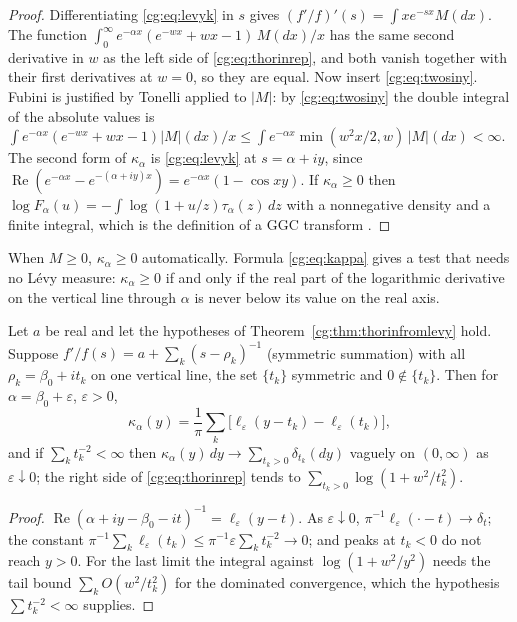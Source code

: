 \begin{proof}
Differentiating \eqref{cg:eq:levyk} in $s$ gives $(f'/f)'(s)=\int xe^{-sx}M(dx)$. The function $\int_0^\infty e^{-\alpha x}(e^{-wx}+wx-1)\,M(dx)/x$ has the same second derivative in $w$ as the left side of \eqref{cg:eq:thorinrep}, and both vanish together with their first derivatives at $w=0$, so they are equal. Now insert \eqref{cg:eq:twosiny}. Fubini is justified by Tonelli applied to $|M|$: by \eqref{cg:eq:twosiny} the double integral of the absolute values is $\int e^{-\alpha x}(e^{-wx}+wx-1)|M|(dx)/x\le\int e^{-\alpha x}\min(w^2x/2,w)\,|M|(dx)<\infty$. The second form of $\kappa_\alpha$ is \eqref{cg:eq:levyk} at $s=\alpha+iy$, since $\operatorname{Re}(e^{-\alpha x}-e^{-(\alpha+iy)x})=e^{-\alpha x}(1-\cos xy)$. If $\kappa_\alpha\ge0$ then $\log F_\alpha(u)=-\int\log(1+u/z)\tau_\alpha(z)\,dz$ with a nonnegative density and a finite integral, which is the definition of a GGC transform \cite{Bondesson}.
\end{proof}

When $M\ge0$, $\kappa_\alpha\ge0$ automatically. Formula \eqref{cg:eq:kappa} gives a test that needs no L\'evy measure: $\kappa_\alpha\ge0$ if and only if the real part of the logarithmic derivative on the vertical line through $\alpha$ is never below its value on the real axis.

\begin{corollary}\label{cg:cor:lorentz}
Let $a$ be real and let the hypotheses of Theorem~\ref{cg:thm:thorinfromlevy} hold. Suppose $f'/f(s)=a+\sum_k(s-\rho_k)^{-1}$ (symmetric summation) with all $\rho_k=\beta_0+it_k$ on one vertical line, the set $\{t_k\}$ symmetric and $0\notin\{t_k\}$. Then for $\alpha=\beta_0+\varepsilon$, $\varepsilon>0$,
\begin{equation}\label{cg:eq:lorentz}
\kappa_\alpha(y)=\frac1\pi\sum_k\bigl[\ell_\varepsilon(y-t_k)-\ell_\varepsilon(t_k)\bigr],
\end{equation}
and if $\sum_kt_k^{-2}<\infty$ then $\kappa_\alpha(y)\,dy\to\sum_{t_k>0}\delta_{t_k}(dy)$ vaguely on $(0,\infty)$ as $\varepsilon\downarrow0$; the right side of \eqref{cg:eq:thorinrep} tends to $\sum_{t_k>0}\log(1+w^2/t_k^2)$.
\end{corollary}

\begin{proof}
$\operatorname{Re}(\alpha+iy-\beta_0-it)^{-1}=\ell_\varepsilon(y-t)$. As $\varepsilon\downarrow0$, $\pi^{-1}\ell_\varepsilon(\cdot-t)\to\delta_t$; the constant $\pi^{-1}\sum_k\ell_\varepsilon(t_k)\le\pi^{-1}\varepsilon\sum_kt_k^{-2}\to0$; and peaks at $t_k<0$ do not reach $y>0$. For the last limit the integral against $\log(1+w^2/y^2)$ needs the tail bound $\sum_{k}O(w^2/t_k^2)$ for the dominated convergence, which the hypothesis $\sum t_k^{-2}<\infty$ supplies.
\end{proof}

